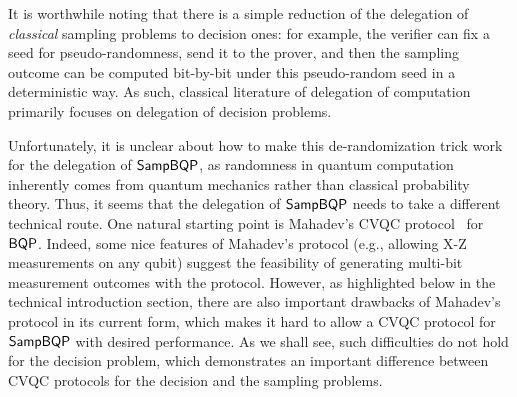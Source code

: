 It is worthwhile noting that there is a simple reduction of the delegation of \emph{classical} sampling problems to decision ones: for example, the verifier can fix a seed for pseudo-randomness, send it to the prover, and then the sampling outcome can be computed  bit-by-bit under this pseudo-random seed in a deterministic way. As such, classical literature of delegation of computation primarily focuses on delegation of decision problems. %

Unfortunately, it is unclear about how to make this de-randomization trick work for the delegation of $\operatorname{\mathsf{SampBQP}}$, 
as randomness in quantum computation inherently comes from quantum mechanics rather than classical probability theory. 
Thus, it seems that the delegation of $\operatorname{\mathsf{SampBQP}}$ needs to take a different technical route.
%
One natural starting point is Mahadev's CVQC protocol~\cite{FOCS:Mahadev18a} for $\operatorname{\mathsf{BQP}}$. 
Indeed, some nice features of Mahadev's protocol (e.g., allowing X-Z measurements on any qubit) suggest the feasibility of generating  multi-bit measurement outcomes with the protocol. 
However, as highlighted below in the technical introduction section, there are also important drawbacks of Mahadev's protocol in its current form, which makes it hard to allow a CVQC protocol for $\operatorname{\mathsf{SampBQP}}$ with desired performance. As we shall see, such difficulties do not hold for the decision problem, which demonstrates an important difference between CVQC protocols for the decision and the sampling problems. 




